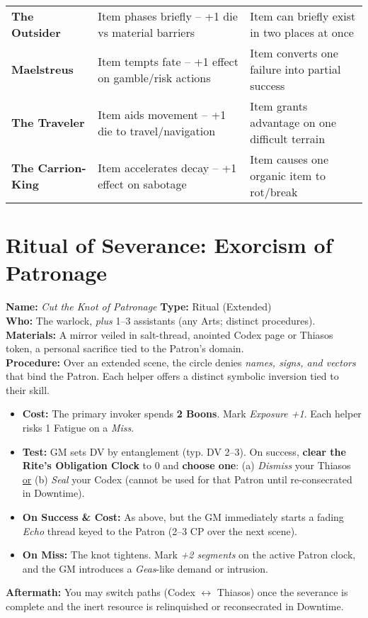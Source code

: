 \documentclass[12pt,twoside]{book}
\begin{document}
\begin{table}[htbp]
\begin{tabular}{>{\bfseries}l >{\raggedright\arraybackslash}p{5cm} >{\raggedright\arraybackslash}p{5cm}}
The Outsider & Item phases briefly -- +1 die vs material barriers & Item can briefly exist in two places at once \\
Maelstreus & Item tempts fate -- +1 effect on gamble/risk actions & Item converts one failure into partial success \\
The Traveler & Item aids movement -- +1 die to travel/navigation & Item grants advantage on one difficult terrain \\
The Carrion-King & Item accelerates decay -- +1 effect on sabotage & Item causes one organic item to rot/break \\
\bottomrule
\end{tabular}
\end{table}


\section{Ritual of Severance: Exorcism of Patronage}
\label{subsec:exorcism}
\textbf{Name:} \emph{Cut the Knot of Patronage} \quad \textbf{Type:} Ritual (Extended) \\
\textbf{Who:} The warlock, \emph{plus} 1--3 assistants (any Arts; distinct procedures). \\
\textbf{Materials:} A mirror veiled in salt-thread, anointed Codex page or Thiasos token, a personal sacrifice tied to the Patron’s domain. \\
\textbf{Procedure:} Over an extended scene, the circle denies \emph{names, signs, and vectors} that bind the Patron. Each helper offers a distinct symbolic inversion tied to their skill.
\begin{itemize}
  \item \textbf{Cost:} The primary invoker spends \textbf{2 Boons}. Mark \emph{Exposure +1}. Each helper risks 1 Fatigue on a \emph{Miss}.
  \item \textbf{Test:} GM sets DV by entanglement (typ. DV 2–3). On success, \textbf{clear the Rite’s Obligation Clock} to 0 and \textbf{choose one}: (a) \emph{Dismiss} your Thiasos \underline{or} (b) \emph{Seal} your Codex (cannot be used for that Patron until re-consecrated in Downtime).
  \item \textbf{On Success \& Cost:} As above, but the GM immediately starts a fading \emph{Echo} thread keyed to the Patron (2–3 CP over the next scene).
  \item \textbf{On Miss:} The knot tightens. Mark \emph{+2 segments} on the active Patron clock, and the GM introduces a \emph{Geas}-like demand or intrusion.
\end{itemize}
\textbf{Aftermath:} You may switch paths (Codex $\leftrightarrow$ Thiasos) once the severance is complete and the inert resource is relinquished or reconsecrated in Downtime.
\end{document}
